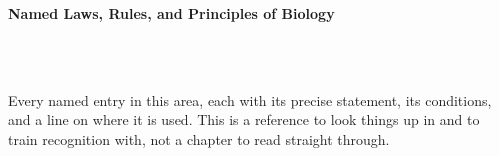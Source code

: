



\makeindex[title={Index of This Volume},columns=2,intoc]

\begin{titlepage}\thispagestyle{empty}
\vspace*{0.14\textheight}
\noindent{\color{tiercat}\rule{\textwidth}{5pt}}\\[3pt]
\noindent{\color{bioline}\rule{\textwidth}{1pt}}\\[26pt]
\\[12pt]
\noindent\begin{minipage}{\textwidth}\raggedright
{\sffamily\bfseries\fontsize{28}{32}\selectfont\color{bioink}%
 \hyphenchar{} Named Laws, Rules, and Principles of Biology\par}\end{minipage}\\[16pt]
\noindent{\color{biogreen}\rule{\textwidth}{1.4pt}}\\[10pt]
\noindent\begin{minipage}{\textwidth}\raggedright
{\fontsize{10.5}{14}\selectfont\color{biogreen}%
Every named entry in this area, each with its precise statement, its conditions, and a line on
where it is used. This is a reference to look things up in and to train recognition with, not a
chapter to read straight through.\par}\end{minipage}
\vfill
\noindent{\color{bioline}\rule{\textwidth}{1pt}}\\[3pt]
\noindent{\color{tiercat}\rule{\textwidth}{5pt}}
\end{titlepage}
\tableofcontents
\clearpage
{}
\clearpage
\printindex

